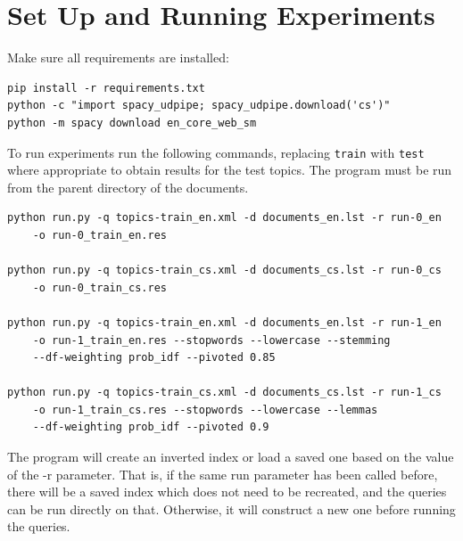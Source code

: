 \documentclass[a4paper]{article}
\begin{document}
\printbibliography

\newpage

\appendix

\section{Set Up and Running Experiments}

Make sure all requirements are installed:
\begin{verbatim}
pip install -r requirements.txt
python -c "import spacy_udpipe; spacy_udpipe.download('cs')"
python -m spacy download en_core_web_sm
\end{verbatim}

To run experiments run the following commands, replacing \texttt{train} with
\texttt{test} where appropriate to obtain results for the test topics.
The program must be run from the parent directory of the documents.
\begin{verbatim}
python run.py -q topics-train_en.xml -d documents_en.lst -r run-0_en
    -o run-0_train_en.res

python run.py -q topics-train_cs.xml -d documents_cs.lst -r run-0_cs
    -o run-0_train_cs.res

python run.py -q topics-train_en.xml -d documents_en.lst -r run-1_en 
    -o run-1_train_en.res --stopwords --lowercase --stemming
    --df-weighting prob_idf --pivoted 0.85

python run.py -q topics-train_cs.xml -d documents_cs.lst -r run-1_cs
    -o run-1_train_cs.res --stopwords --lowercase --lemmas
    --df-weighting prob_idf --pivoted 0.9
\end{verbatim}

The program will create an inverted index or load a saved one based on the value
of the -r parameter.  That is, if the same run parameter has been called before,
there will be a saved index which does not need to be recreated, and the queries
can be run directly on that. Otherwise, it will construct a new one before
running the queries.
\end{document}
